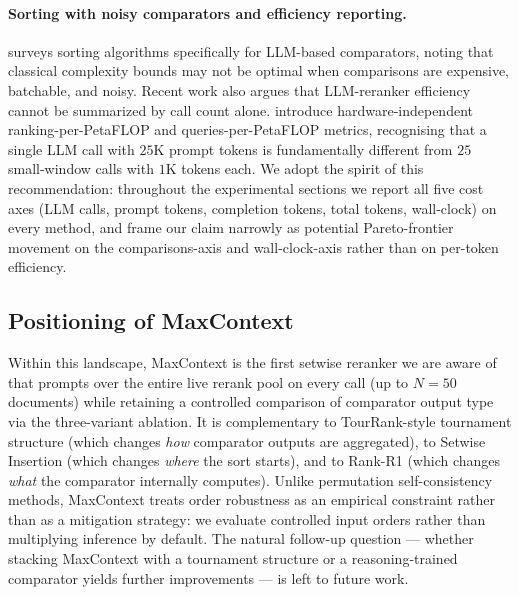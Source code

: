 \paragraph{Sorting with noisy comparators and efficiency reporting.}
\citet{sato2026sortingsurvey} surveys sorting algorithms specifically for
LLM-based comparators, noting that classical complexity bounds may not be
optimal when comparisons are expensive, batchable, and noisy. Recent work
also argues that LLM-reranker efficiency cannot be summarized by call count
alone. \citet{peng2025flopsreranking} introduce hardware-independent
ranking-per-PetaFLOP and queries-per-PetaFLOP metrics, recognising that a
single LLM call with $25$K prompt tokens is fundamentally different from
$25$ small-window calls with $1$K tokens each. We adopt the spirit of this
recommendation: throughout the experimental sections we report all five cost
axes (LLM calls, prompt tokens, completion tokens, total tokens, wall-clock)
on every method, and frame our claim narrowly as potential Pareto-frontier
movement on the comparisons-axis and wall-clock-axis rather than on
per-token efficiency.

\subsection{Positioning of MaxContext}

Within this landscape, MaxContext is the first setwise reranker we are aware
of that prompts over the entire live rerank pool on every call (up to
$N{=}50$ documents) while retaining a controlled comparison of comparator
output type via the three-variant ablation. It is complementary to
TourRank-style tournament structure (which changes \emph{how} comparator
outputs are aggregated), to Setwise Insertion (which changes \emph{where}
the sort starts), and to Rank-R1 (which changes \emph{what} the comparator
internally computes). Unlike permutation self-consistency methods, MaxContext
treats order robustness as an empirical constraint rather than as a
mitigation strategy: we evaluate controlled input orders rather than
multiplying inference by default. The natural follow-up question --- whether
stacking MaxContext with a tournament structure or a reasoning-trained
comparator yields further improvements --- is left to future work.
